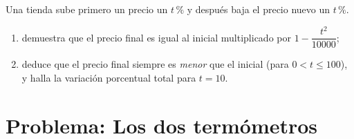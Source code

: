 \begin{exercise}[$\star\star\star$]\label{exo:g9:linfunc:10}
Una tienda sube primero un precio un $t\,\%$ y después baja el precio nuevo un
$t\,\%$.
\begin{enumerate}
  \item demuestra que el precio final es igual al inicial multiplicado por
        $1 - \dfrac{t^2}{10000}$;
  \item deduce que el precio final siempre es \emph{menor} que el
        inicial (para $0 < t \leq 100$), y halla la variación porcentual
        total para $t = 10$.
\end{enumerate}
\end{exercise}

\section{Problema: Los dos termómetros}

